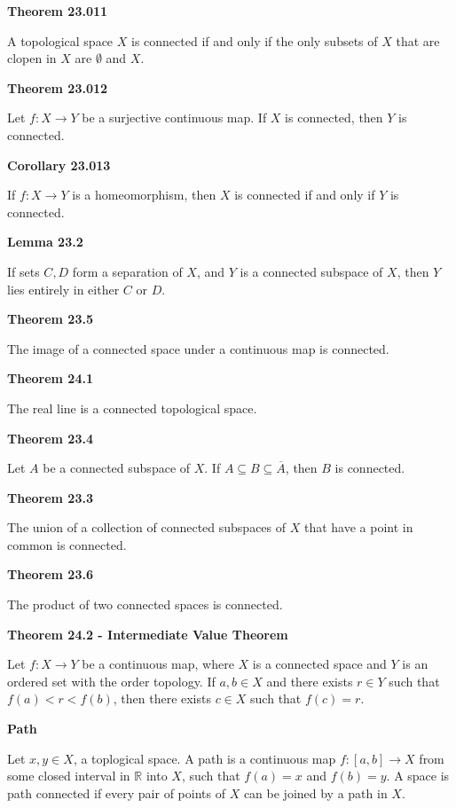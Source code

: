 \documentclass{article}
\begin{document}
\medskip\noindent\textbf{Theorem 23.011}

	A topological space $X$ is connected if and only if the only subsets of $X$ that are clopen in $X$ are $\emptyset$ and $X$.

\medskip\noindent\textbf{Theorem 23.012}

	Let $f: X \to Y$ be a surjective continuous map.
	If $X$ is connected, then $Y$ is connected.

\medskip\noindent\textbf{Corollary 23.013}

	If $f: X \to Y$ is a homeomorphism, then $X$ is connected if and only if $Y$ is connected.

\medskip\noindent\textbf{Lemma 23.2}

	If sets $C, D$ form a separation of $X$, and $Y$ is a connected subspace of $X$, then $Y$ lies entirely in either $C$ or $D$.

\medskip\noindent\textbf{Theorem 23.5}

	The image of a connected space under a continuous map is connected.

\medskip\noindent\textbf{Theorem 24.1}

	The real line is a connected topological space.

\medskip\noindent\textbf{Theorem 23.4}

	Let $A$ be a connected subspace of $X$. If $A \subseteq B \subseteq \overline A$, then $B$ is connected.

\medskip\noindent\textbf{Theorem 23.3}

	The union of a collection of connected subspaces of $X$ that have a point in common is connected.

\medskip\noindent\textbf{Theorem 23.6}

	The product of two connected spaces is connected.

\medskip\noindent\textbf{Theorem 24.2 - Intermediate Value Theorem}

    Let $f: X \to Y$ be a continuous map, where $X$ is a connected space and $Y$ is an ordered set with the order topology.
    If $a,b \in X$ and there exists $r \in Y$ such that $f(a) < r < f(b)$, then there exists $c \in X$ such that $f(c) = r$.

\medskip\noindent\textbf{Path}

    Let $x,y \in X$, a toplogical space.
    A path is a continuous map $f: [a,b] \to X$ from some closed interval in $\mathbb R$ into $X$, such that $f(a) = x$ and $f(b) = y$.
    A space is path connected if every pair of points of $X$ can be joined by a path in $X$.
\end{document}
